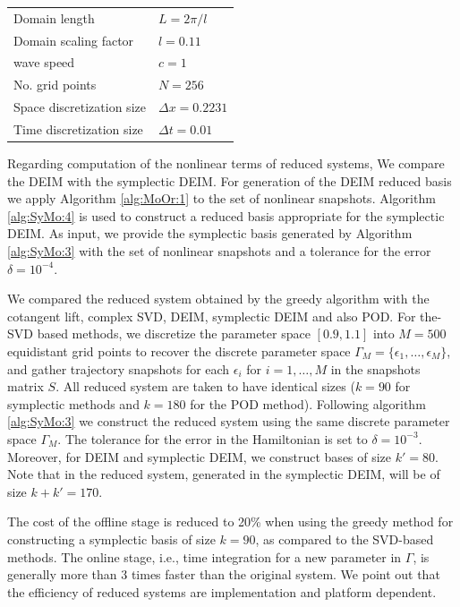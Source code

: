 \vspace{0.5cm}
\begin{center}
\begin{tabular}{|l|l|}
\hline
Domain length & $L = 2\pi /l$ \\
Domain scaling factor & $l = 0.11$ \\
wave speed & $c =1$\\
No. grid points & $N = 256$ \\
Space discretization size & $\Delta x = 0.2231$ \\
Time discretization size & $\Delta t = 0.01$ \\
\hline
\end{tabular}
\end{center}
\vspace{0.5cm}

Regarding computation of the nonlinear terms of reduced systems, We compare the DEIM with the symplectic DEIM. For generation of the DEIM reduced basis we apply Algorithm \ref{alg:MoOr:1} to the set of nonlinear snapshots. Algorithm \ref{alg:SyMo:4} is used to construct a reduced basis appropriate for the symplectic DEIM. As input, we provide the symplectic basis generated by Algorithm \ref{alg:SyMo:3} with the set of nonlinear snapshots and a tolerance for the error $\delta = 10^{-4}$.

We compared the reduced system obtained by the greedy algorithm with the cotangent lift, complex SVD, DEIM, symplectic DEIM and also POD. For the-SVD based methods, we discretize the parameter space $[0.9,1.1]$ into $M=500$ equidistant grid points to recover the discrete parameter space $\Gamma_M = \{\epsilon_1,\dots,\epsilon_M \}$, and gather trajectory snapshots for each $\epsilon_i$ for $i = 1,\dots,M$ in the snapshots matrix $S$. All reduced system are taken to have identical sizes ($k=90$ for symplectic methods and $k=180$ for the POD method). Following algorithm \ref{alg:SyMo:3} we construct the reduced system using the same discrete parameter space $\Gamma_M$. The tolerance for the error in the Hamiltonian is set to $\delta = 10^{-3}$. Moreover, for DEIM and symplectic DEIM, we construct bases of size $k'=80$. Note that in the reduced system, generated in the symplectic DEIM, will be of size $k+k'=170$.

The cost of the offline stage is reduced to 20\% when using the greedy method for constructing a symplectic basis of size $k=90$, as compared to the SVD-based methods. The online stage, i.e., time integration for a new parameter in $\Gamma$, is generally more than 3 times faster than the original system. We point out that the efficiency of reduced systems are implementation and platform dependent.

